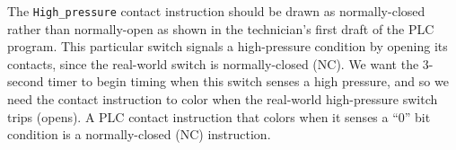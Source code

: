 





The {\tt High\_pressure} contact instruction should be drawn as normally-closed rather than normally-open as shown in the technician's first draft of the PLC program.  This particular switch signals a high-pressure condition by opening its contacts, since the real-world switch is normally-closed (NC).  We want the 3-second timer to begin timing when this switch senses a high pressure, and so we need the contact instruction to color when the real-world high-pressure switch trips (opens).  A PLC contact instruction that colors when it senses a ``0'' bit condition is a normally-closed (NC) instruction.











